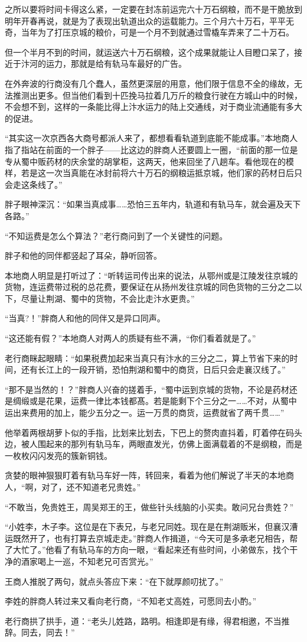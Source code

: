 之所以要将时间卡得这么紧，一定要在封冻前运完六十万石纲粮，而不是干脆放到明年开春再说，就是为了表现出轨道出众的运载能力。三个月六十万石，平平无奇，当年为了打压京城的粮价，可是一个月不到就通过雪橇车弄来了二十万石。

但一个半月不到的时间，就运送六十万石纲粮，这个成果就能让人目瞪口呆了，接近于汴河的运力，那就是给有轨马车最好的广告。

在外奔波的行商没有几个蠢人，虽然更深层的用意，他们限于信息不全的缘故，无法推测出更多。但当他们看到十匹挽马拉着几万斤的粮食行驶在方城山中的时候，不会想不到，这样的一条能比得上汴水运力的陆上交通线，对于商业流通能有多大的促进。

“其实这一次京西各大商号都派人来了，都想看看轨道到底能不能成事。”本地商人指了指站在前面的一个胖子——比这边的胖商人还要圆上一圈，“前面的那一位是专从蜀中贩药材的庆余堂的胡掌柜，这两天，他来回坐了八趟车。看他现在的模样，若是这一次当真能在冰封前将六十万石的纲粮运抵京城，他们家的药材日后只会走这条线了。”

胖子眼神深沉：“如果当真成事……恐怕三五年内，轨道和有轨马车，就会遍及天下各路。”

“不知运费是怎么个算法？”老行商问到了一个关键性的问题。

胖子和他的同伴都竖起了耳朵，静听回答。

本地商人明显是打听过了：“听转运司传出来的说法，从鄂州或是江陵发往京城的货物，连运费带过税的总花费，要保证在从扬州发往京城的同色货物的三分之二以下，尽量让荆湖、蜀中的货物，不会比走汴水更贵。”

“当真?！”胖商人和他的同伴又是异口同声。

“这还能有假？”本地商人对两人的质疑有些不满，“你们看着就是了。”

老行商眯起眼睛：“如果税费加起来当真只有汴水的三分之二，算上节省下来的时间，还有长江上的一段开销，恐怕荆湖和蜀中的商货，日后只会走襄汉线了。”

“那不是当然的！？”胖商人兴奋的搓着手，“蜀中运到京城的货物，不论是药材还是绸缎或是花果，运费一律比本钱都髙。若是能剩下个三分之一……不对，从蜀中运出来费用的加上，能少五分之一。运一万贯的商货，运费就省了两千贯……”

他举着两根胡萝卜似的手指，比划来比划去，下巴上的赘肉直抖着，盯着停在码头边，被人围起来的那列有轨马车，两眼直发光，仿佛上面满载着的不是纲粮，而是一枚枚闪闪发亮的簇新铜钱。

贪婪的眼神狠狠盯着有轨马车好一阵，转回来，看着为他们解说了半天的本地商人，“啊，对了，还不知道老兄贵姓。”

“不敢当，免贵姓王，周吴郑王的王，做些针头线脑的小买卖。敢问兄台贵姓？”

“小姓李，木子李。这位是在下表兄，与老兄同姓。现在是在荆湖贩米，但襄汉漕运既然开了，也有打算去京城走走。”胖商人作揖道，“今天可是多承老兄相告，帮了大忙了。”他看了有轨马车的方向一眼，“看起来还有些时间，小弟做东，找个干净的酒家喝上一巡，不知老兄可否赏光。”

王商人推脱了两句，就点头答应下来：“在下就厚颜叨扰了。”

李姓的胖商人转过来又看向老行商，“不知老丈高姓，可愿同去小酌。”

老行商拱了拱手，道：“老头儿姓路，路明。相逢即是有缘，得君相邀，不当推辞。同去，同去！”

